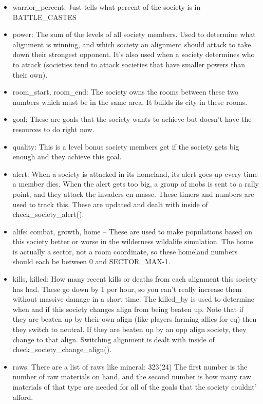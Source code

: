 \begin{itemize}
\item warrior\_percent: Just tells what percent of the society is in 
BATTLE\_CASTES

\item power: The sum of the levels of all society members. Used to
determine what alignment is winning, and which society an alignment
should attack to take down their strongest opponent. It's also used
when a society determines who to attack (societies tend to attack
societies that have smaller powers than their own).

\item room\_start, room\_end: The society owns the rooms between these
two numbers which must be in the same area. It builds its city in
these rooms.

\item goal; These are goals that the society wants to achieve but
doesn't have the resources to do right now.

\item quality: This is a level bonus society members get if the
society gets big enough and they achieve this goal. 

\item alert: When a society is attacked in its homeland, its alert
goes up every time a member dies. When the alert gets too big, a 
group of mobs is sent to a rally point, and they attack the
invaders en-masse. These timers and numbers are used to track this.
These are updated and dealt with inside of check\_society\_alert().

\item alife:  combat, growth, home -- These are used to make populations
based on this society better or worse in the wilderness wildalife
simulation. The home is actually a sector, not a room coordinate, so
these homeland numbers should each be between 0 and SECTOR\_MAX-1.

\item kills, killed: How many recent kills or deaths from each alignment
this society has had. These go down by 1 per hour, so you can't really
increase them without massive damage in a short time. The killed\_by is
used to determine when and if this society changes align from being
beaten up. Note that if they are beaten up by their own align (like
players farming allies for eq) then they switch to neutral. If they are
beaten up by an opp align society, they change to that align. 
Switching alignment is dealt with inside of check\_society\_change\_align().

\item raws: There are a list of raws like mineral: 323(24) The first number
is the number of raw materials on hand, and the second number is how
many raw materials of that type are needed for all of the goals that the
society couldnt' afford.


\end{itemize}
